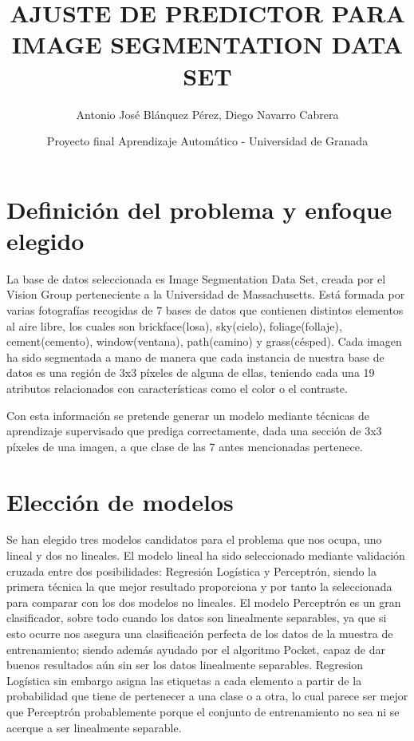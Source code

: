 \documentclass{article}
\title{AJUSTE DE PREDICTOR PARA IMAGE SEGMENTATION DATA SET}
\author{Antonio José Blánquez Pérez, Diego Navarro Cabrera}
\date{Proyecto final Aprendizaje Automático - Universidad de Granada}
\begin{document}
 \setlength{\parskip}{1em} 

	\maketitle
	\renewcommand{\contentsname}{Índice}
	\tableofcontents
  \newpage
	

	\section{Definición del problema y enfoque elegido}

	La base de datos seleccionada es Image Segmentation Data Set, creada por el Vision Group perteneciente a la Universidad de Massachusetts. Está formada por varias fotografías recogidas de 7 bases de datos que contienen distintos elementos al aire libre, los cuales son brickface(losa), sky(cielo), foliage(follaje), cement(cemento), window(ventana), path(camino) y grass(césped). Cada imagen ha sido segmentada a mano de manera que cada instancia de nuestra base de datos es una región de 3x3 píxeles de alguna de ellas, teniendo cada una 19 atributos relacionados con características como el color o el contraste. 
	\par
	Con esta información se pretende generar un modelo mediante técnicas de aprendizaje supervisado que prediga correctamente, dada una sección de 3x3 píxeles de una imagen, a que clase de las 7 antes mencionadas pertenece.
	
	\section{Elección de modelos}
	
	Se han elegido tres modelos candidatos para el problema que nos ocupa, uno lineal y dos no lineales. El modelo lineal ha sido seleccionado mediante validación cruzada entre dos posibilidades: Regresión Logística y Perceptrón, siendo la primera técnica la que mejor resultado proporciona y por tanto la seleccionada para comparar con los dos modelos no lineales. El modelo Perceptrón es un gran clasificador, sobre todo cuando los datos son linealmente separables, ya que si esto ocurre nos asegura una clasificación perfecta de los datos de la muestra de entrenamiento; siendo además ayudado por el algoritmo Pocket, capaz de dar buenos resultados aún sin ser los datos linealmente separables. Regresion Logística sin embargo asigna las etiquetas a cada elemento a partir de la probabilidad que tiene de pertenecer a una clase o a otra, lo cual parece ser mejor que Perceptrón probablemente porque el conjunto de entrenamiento no sea ni se acerque a ser linealmente separable.
		
\end{document}
